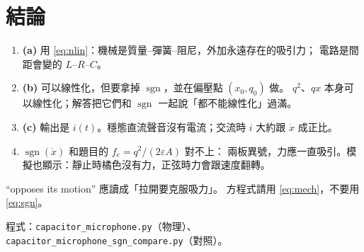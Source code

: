 \documentclass[12pt,a4paper]{article}
\begin{document}
\section{結論}

\begin{enumerate}
  \item \textbf{(a)} 用 \eqref{eq:nlin}：機械是質量--彈簧--阻尼，外加永遠存在的吸引力；
        電路是間距會變的 \(L\)--\(R\)--\(C\)。
  \item \textbf{(b)} 可以線性化，但要拿掉 \(\operatorname{sgn}\)，並在偏壓點 \((x_0,q_0)\) 做。
        \(q^2\)、\(qx\) 本身可以線性化；解答把它們和 \(\operatorname{sgn}\) 一起說「都不能線性化」過滿。
  \item \textbf{(c)} 輸出是 \(i(t)\)。穩態直流聲音沒有電流；交流時 \(i\) 大約跟 \(\dot{x}\) 成正比。
  \item \(\operatorname{sgn}(\dot{x})\) 和題目的 \(f_e=q^2/(2\varepsilon A)\) 對不上：
        兩板異號，力應一直吸引。模擬也顯示：靜止時橘色沒有力，正弦時力會跟速度翻轉。
\end{enumerate}

“opposes its motion” 應讀成「拉開要克服吸力」。
方程式請用 \eqref{eq:mech}，不要用 \eqref{eq:sgn}。

\vspace{0.8em}
\noindent 程式：\texttt{capacitor\_microphone.py}（物理）、
\texttt{capacitor\_microphone\_sgn\_compare.py}（對照）。
\end{document}
